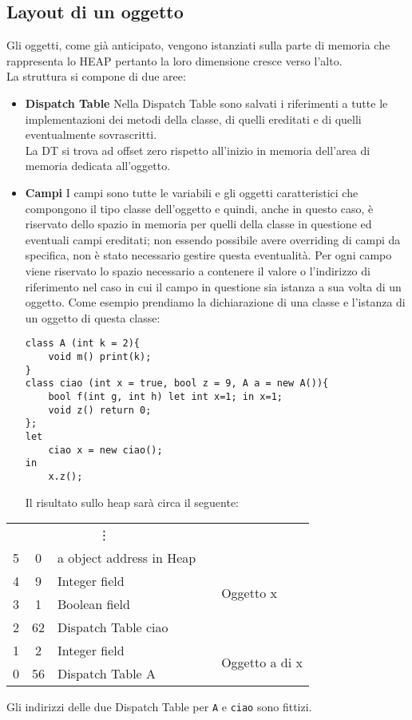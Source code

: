 \documentclass[a4paper]{article}   %
\begin{document}
\subsection{Layout di un oggetto}
Gli oggetti, come già anticipato, vengono istanziati sulla parte di memoria che rappresenta lo HEAP pertanto la loro dimensione cresce verso l'alto.\\
La struttura si compone di due aree:
\begin{itemize}
\item \textbf{Dispatch Table}\newline
Nella Dispatch Table sono salvati i riferimenti a tutte le implementazioni dei metodi della classe, di quelli ereditati e di quelli eventualmente sovrascritti.\\
La DT si trova ad offset zero rispetto all'inizio in memoria dell'area di memoria dedicata all'oggetto.
\item \textbf{Campi}\newline
I campi sono tutte le variabili e gli oggetti caratteristici che compongono il tipo classe dell'oggetto e quindi, anche in questo caso, è riservato dello spazio in memoria per quelli della classe in questione ed eventuali campi ereditati; non essendo possibile avere overriding di campi da specifica, non è stato necessario gestire questa eventualità.
Per ogni campo viene riservato lo spazio necessario a contenere il valore o l'indirizzo di riferimento nel caso in cui il campo in questione sia istanza a sua volta di un oggetto.
Come esempio prendiamo la dichiarazione di una classe e l'istanza di un oggetto di questa classe:
\begin{lstlisting}[basicstyle=\footnotesize\ttfamily]
class A (int k = 2){
	void m() print(k);
}
class ciao (int x = true, bool z = 9, A a = new A()){
    bool f(int g, int h) let int x=1; in x=1;
    void z() return 0;
};
let
    ciao x = new ciao();
in
    x.z();
\end{lstlisting}
Il risultato sullo heap sarà circa il seguente:
\end{itemize}
\begin{center}
\begin{tabular}{|c|c|l|cl}
\multicolumn{3}{|c|}{\vdots}      &  & \multicolumn{1}{c}{}            \\ \cline{1-3} \cline{5-5} 
5 & 0  & a object address in Heap &  & \multirow{4}{*}{Oggetto x}      \\ \cline{1-3}
4 & 9  & Integer field            &  &                                 \\ \cline{1-3}
3 & 1  & Boolean field            &  &                                 \\ \cline{1-3}
2 & 62 & Dispatch Table ciao      &  &                                 \\ \cline{1-3} \cline{5-5} 
1 & 2  & Integer field            &  & \multirow{2}{*}{Oggetto a di x} \\ \cline{1-3}
0 & 56 & Dispatch Table A         &  &                                 \\ \cline{1-3} \cline{5-5} 
\end{tabular}
\end{center}
Gli indirizzi delle due Dispatch Table per \lstinline|A| e \lstinline|ciao| sono fittizi.
\end{document}
